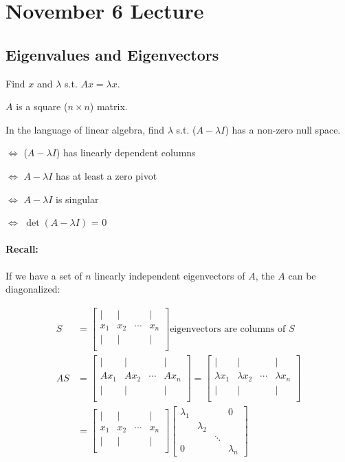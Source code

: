 \section{November 6 Lecture}

\subsection{Eigenvalues and Eigenvectors}

Find $x$ and $\lambda$ s.t. $Ax = \lambda x$.

$A$ is a square ($n \times n$) matrix.

In the language of linear algebra, find $\lambda$ s.t. ($A-\lambda I$) has a non-zero null space.

$\iff$ ($A-\lambda I$) has linearly dependent columns

$\iff$ $A-\lambda I$ has at least a zero pivot

$\iff$ $A-\lambda I$ is singular

$\iff$ $\det(A-\lambda I)$ = 0

\paragraph{Recall:} If we have a set of $n$ linearly independent eigenvectors of $A$, the $A$ can be diagonalized:

\begin{align*}
  S &=
  \begin{bmatrix}
    | & | &  & | \\
    x_1 & x_2 & \cdots & x_n \\
    | & | &  & | \\
  \end{bmatrix} 
  \text{eigenvectors are columns of } S\\
  AS &=
  \begin{bmatrix}
    | & | &  & | \\
    Ax_1 & Ax_2 & \cdots & Ax_n \\
    | & | &  & | \\
  \end{bmatrix} =
  \begin{bmatrix}
    | & | &  & | \\
    \lambda x_1 & \lambda x_2 & \cdots & \lambda x_n \\
    | & | &  & | \\
  \end{bmatrix} \\
  &=
  \begin{bmatrix}
    | & | &  & | \\
    x_1 & x_2 & \cdots & x_n \\
    | & | &  & | \\
  \end{bmatrix}
  \begin{bmatrix}
    \lambda_1 & & & 0 \\
    & \lambda_2 &\\
    & & \ddots\\
    0& & & \lambda_n
  \end{bmatrix}
\end{align*}

